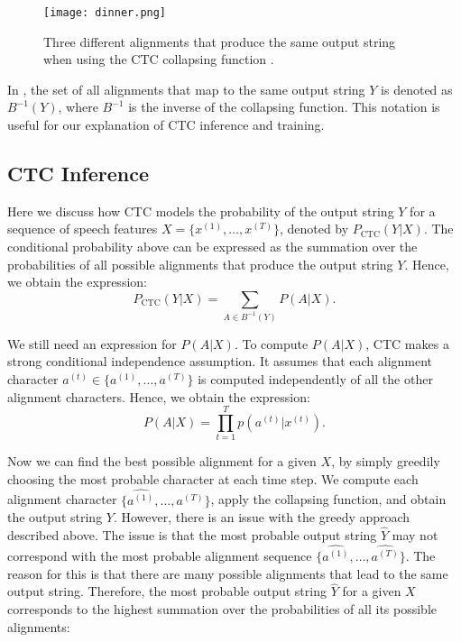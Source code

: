 \begin{figure}[h!]
    \centering
    \captionsetup{justification=centering}
    \texttt{[image: dinner.png]}
    \caption{Three different alignments that produce the same output string when using the CTC collapsing function \cite{jurafskyspeech}.}
    \label{dinner}
\end{figure}

In \cite{jurafskyspeech}, the set of all alignments that map to the same output string $Y$ is denoted as $B^{-1}(Y)$, 
where $B^{-1}$ is the inverse of the collapsing function.
This notation is useful for our explanation of CTC inference and training.

\subsection{CTC Inference}
Here we discuss how CTC models the probability of the output string $Y$ 
for a sequence of speech features $X = \{x^{(1)}, \dots, x^{(T)}\}$, 
denoted by $P_{\text{CTC}}(Y|X)$.
The conditional probability above can be expressed as the summation over the probabilities
of all possible alignments that produce the output string $Y$. 
Hence, we obtain the expression: 
\begin{equation}
    P_{\text{CTC}}(Y|X) = \sum\limits_{A \in B^{-1}(Y)} P(A|X).
\end{equation}

We still need an expression for $P(A|X)$.
To compute $P(A|X)$, CTC makes a strong conditional independence assumption. 
It assumes that each alignment character $a^{(t)} \in \{a^{(1)}, \dots, a^{(T)}\}$ 
is computed independently of all the other alignment characters.
Hence, we obtain the expression:
\begin{equation}
    P(A|X) = \prod\limits_{t=1}^{T} p(a^{(t)} | x^{(t)}).
\end{equation}

Now we can find the best possible alignment for a given $X$, by simply greedily choosing the most probable character at each time step.
We compute each alignment character $\{\hat{a^{(1)}}, \dots, \hat{a^{(T)}}\}$, apply the collapsing function, and obtain the output string $Y$.
However, there is an issue with the greedy approach described above. 
The issue is that the most probable output string $\hat{Y}$ may not correspond
with the most probable alignment sequence $\{\hat{a^{(1)}}, \dots, \hat{a^{(T)}}\}$.
The reason for this is that there are many possible alignments that lead to the same
output string. Therefore, the most probable output string $\hat{Y}$ for a given $X$ corresponds to the highest summation over the probabilities of all its
possible alignments:

